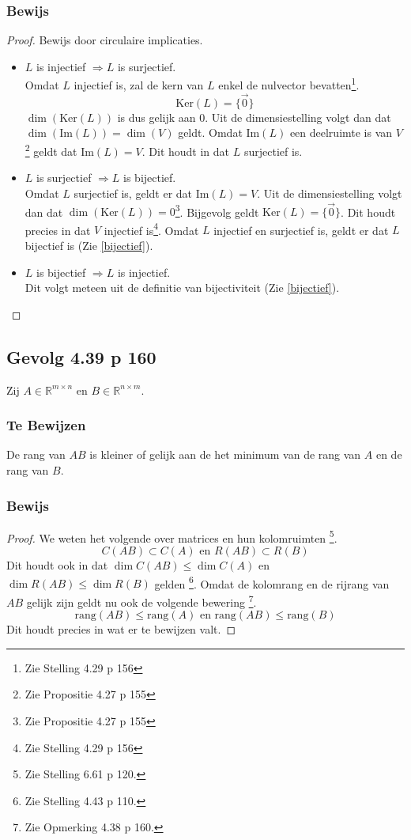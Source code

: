 \documentclass[lineaire_algebra_oplossingen.tex]{subfiles}
\begin{document}
\subsubsection*{Bewijs}
\begin{proof}
Bewijs door circulaire implicaties.
\begin{itemize}
\item $L$ is injectief $\Rightarrow L$ is surjectief.\\
Omdat $L$ injectief is, zal de kern van $L$ enkel de nulvector bevatten\footnote{Zie Stelling 4.29 p 156}.
\[\text{Ker}(L) = \{\vec{0}\}\]
$\dim (\text{Ker}(L))$ is dus gelijk aan $0$. Uit de dimensiestelling volgt dan dat $\dim (\text{Im}(L)) = \dim (V)$ geldt. Omdat $\text{Im}(L)$ een deelruimte is van $V$\footnote{Zie Propositie 4.27 p 155} geldt dat $\text{Im}(L) = V$. Dit houdt in dat $L$ surjectief is.

\item $L$ is surjectief $\Rightarrow L$ is bijectief.\\
Omdat $L$ surjectief is, geldt er dat $\text{Im}(L)=V$. Uit de dimensiestelling volgt dan dat $\dim (\text{Ker}(L)) = 0$\footnote{Zie Propositie 4.27 p 155}. Bijgevolg geldt $\text{Ker}(L) = \{\vec{0}\}$. Dit houdt precies in dat $V$ injectief is\footnote{Zie Stelling 4.29 p 156}. Omdat $L$ injectief en surjectief is, geldt er dat $L$ bijectief is (Zie \ref{bijectief}).

\item $L$ is bijectief $\Rightarrow L$ is injectief.\\
Dit volgt meteen uit de definitie van bijectiviteit (Zie \ref{bijectief}).
\end{itemize}
\end{proof}

\subsection{Gevolg 4.39 p 160}
\label{4.39}
Zij $A \in \mathbb{R}^{m\times n}$ en $B \in \mathbb{R}^{n\times m}$.

\subsubsection*{Te Bewijzen}
De rang van $AB$ is kleiner of gelijk aan de het minimum van de rang van $A$ en de rang van $B$.

\subsubsection*{Bewijs}
\begin{proof}
We weten het volgende over matrices en hun kolomruimten \footnote{Zie Stelling 6.61 p 120.}.
\[
C(AB) \subset C(A) \text{ en } R(AB) \subset R(B)
\]
Dit houdt ook in dat $\dim C(AB) \le \dim C(A)$ en $\dim R(AB) \le \dim R(B)$ gelden \footnote{Zie Stelling 4.43 p 110.}. Omdat de kolomrang en de rijrang van $AB$ gelijk zijn geldt nu ook de volgende bewering \footnote{Zie Opmerking 4.38 p 160.}.
\[
\text{rang}(AB) \le \text{rang}(A) \text{ en } \text{rang}(AB) \le \text{rang}(B)
\]
Dit houdt precies in wat er te bewijzen valt.
\end{proof}
\end{document}
